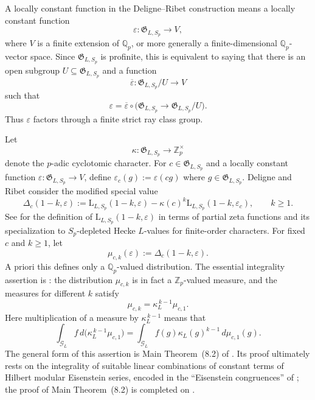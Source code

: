 \documentclass[11pt,table]{amsart}
\numberwithin{equation}{section}
\begin{document}
\par A locally constant function in the Deligne--Ribet construction
means a locally constant function
\[
        \varepsilon:
        \mathfrak G_{L,S_p}
        \longrightarrow V,
\]
where \(V\) is a finite extension of \(\mathbb Q_p\), or more
generally a finite-dimensional \(\mathbb Q_p\)-vector space.  Since
\(\mathfrak G_{L,S_p}\) is profinite, this is equivalent to saying
that there is an open subgroup \(U\subseteq\mathfrak G_{L,S_p}\) and
a function
\[
        \overline{\varepsilon}:
        \mathfrak G_{L,S_p}/U
        \longrightarrow V
\]
such that
\[
        \varepsilon
        =
        \overline{\varepsilon}\circ
        \bigl(
        \mathfrak G_{L,S_p}
        \longrightarrow
        \mathfrak G_{L,S_p}/U
        \bigr).
\]
Thus \(\varepsilon\) factors through a finite strict ray class group.

\par Let \begin{equation}\label{kappadefn}\kappa:
        \mathfrak G_{L,S_p}
        \longrightarrow
        \mathbb Z_p^\times
        \end{equation}
denote the \(p\)-adic cyclotomic character.  For
\(c\in\mathfrak G_{L,S_p}\) and a locally constant function
\(\varepsilon:\mathfrak G_{L,S_p}\to V\), define $\varepsilon_c(g)
        :=
        \varepsilon(cg)$ where $g\in\mathfrak G_{L,S_p}$. Deligne and Ribet consider the modified special value
\[
        \Delta_c(1-k,\varepsilon)
        :=
        \mathrm{L}_{L,S_p}(1-k,\varepsilon)
        -
        \kappa(c)^k
        \mathrm{L}_{L,S_p}(1-k,\varepsilon_c),
        \qquad k\geq1.
\]
See \cite[pp.~230--231]{DeligneRibet} for the definition of \(\mathrm{L}_{L,S_p}(1-k,\varepsilon)\) in terms of partial zeta functions and its specialization to \(S_p\)-depleted Hecke \(L\)-values for finite-order characters.
For fixed \(c\) and \(k\geq1\), let
\[
        \mu_{c,k}(\varepsilon)
        :=
        \Delta_c(1-k,\varepsilon).
\]
A priori this defines only a \(\mathbb Q_p\)-valued distribution.  The
essential integrality assertion is
\cite[Theorem~(0.5), p.~231]{DeligneRibet}: the distribution
\(\mu_{c,k}\) is in fact a \(\mathbb Z_p\)-valued measure, and the
measures for different \(k\) satisfy
\[
        \mu_{c,k}
        =
        \kappa_L^{\,k-1}\mu_{c,1}.
\]
Here multiplication of a measure by \(\kappa_L^{\,k-1}\) means that
\[
        \int_{\mathcal G_L}f\,d
        \bigl(\kappa_L^{\,k-1}\mu_{c,1}\bigr)
        =
        \int_{\mathcal G_L}
        f(g)\kappa_L(g)^{k-1}\,d\mu_{c,1}(g).
\]
The general form of this assertion is Main Theorem~(8.2) of
\cite[p.~278]{DeligneRibet}.  Its proof ultimately rests on the
integrality of suitable linear combinations of constant terms of
Hilbert modular Eisenstein series, encoded in the ``Eisenstein
congruences'' of
\cite[Theorem~(8.4), pp.~278--280]{DeligneRibet}; the proof of
Main Theorem~(8.2) is completed on
\cite[pp.~282--283]{DeligneRibet}.
\end{document}
